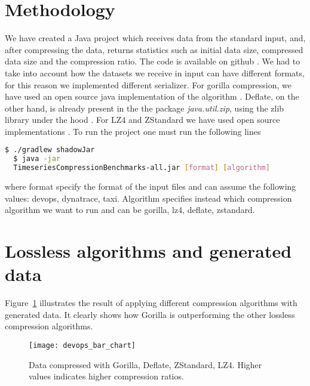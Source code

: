 \section{Methodology}
We have created a Java project which receives data from the standard input, and, after
compressing the data, returns statistics such as initial data size, compressed data size and
the compression ratio. The code is available on github \cite{dovidio_2019_dovidiotscompressionthesis}.
We had to take into account how the datasets we receive in input can have different formats,
for this reason we implemented different serializer.
For gorilla compression, we have used an open source java implementation of the algorithm
\cite{burmanm_2018_burmanmgorillatsc}. Deflate, on the other hand, is already present in the the package
\textit{java.util.zip}, using the zlib library under the hood \cite{a2019_deflater}.
For LZ4 and ZStandard we have used open source implementations \cite{lz4_2019_lz4lz4java}\cite{luben_2015_lubenzstdjni}.
To run the project one must run the following lines
\lstset{
    basicstyle=\small,
    stringstyle=\ttfamily
}
\begin{lstlisting}[language=bash]
  $ ./gradlew shadowJar
  $ java -jar
  TimeseriesCompressionBenchmarks-all.jar [format] [algorithm]
\end{lstlisting}
where format specify the format of the input files and can assume the following values: devops, dynatrace, taxi.
Algorithm specifies instead which compression algorithm we want to run and can be gorilla, lz4, deflate, zstandard.

\section{Lossless algorithms and generated data}
Figure~\ref{devops_lossless_compression} illustrates the result of applying different compression algorithms
with generated data. It clearly shows how Gorilla is outperforming the other lossless compression algorithms.

\begin{figure}[!htbp]
\begin{center}
\texttt{[image: devops\_bar\_chart]}
\caption[compression]{Data compressed with Gorilla, Deflate, ZStandard, LZ4. Higher values indicates higher compression ratios.}
\label{devops_lossless_compression}
\end{center}
\end{figure}

